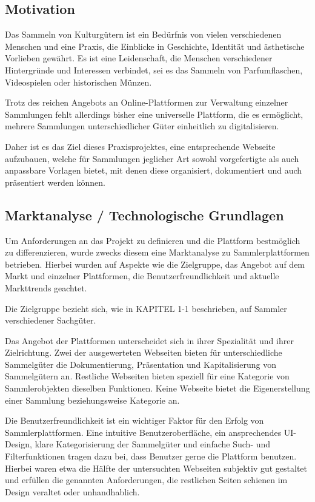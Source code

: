\subsection{Motivation}\label{subsec:Motivation}


Das Sammeln von Kulturgütern ist ein Bedürfnis von vielen verschiedenen Menschen und eine Praxis, die Einblicke in Geschichte, Identität und ästhetische Vorlieben gewährt.
Es ist eine Leidenschaft, die Menschen verschiedener Hintergründe und Interessen verbindet, sei es das Sammeln von Parfumflaschen, Videospielen oder historischen Münzen.

Trotz des reichen Angebots an Online-Plattformen zur Verwaltung einzelner Sammlungen fehlt allerdings bisher eine universelle Plattform, die es ermöglicht, mehrere Sammlungen unterschiedlicher Güter einheitlich zu digitalisieren. \par
Daher ist es das Ziel dieses Praxisprojektes, eine entsprechende Webseite aufzubauen, welche für Sammlungen jeglicher Art sowohl vorgefertigte als auch anpassbare Vorlagen bietet, mit denen diese organisiert, dokumentiert und auch präsentiert werden können.


\subsection{Marktanalyse / Technologische Grundlagen}\label{subsec:Marktanalyse-TechnologischeGrundlagen}

Um Anforderungen an das Projekt zu definieren und die Plattform bestmöglich zu differenzieren, wurde zwecks diesem eine Marktanalyse zu Sammlerplattformen betrieben.
Hierbei wurden auf Aspekte wie die Zielgruppe, das Angebot auf dem Markt und einzelner Plattformen, die Benutzerfreundlichkeit und aktuelle Markttrends geachtet. \par
Die Zielgruppe bezieht sich, wie in KAPITEL 1-1 beschrieben, auf Sammler verschiedener Sachgüter. \linebreak


Das Angebot der Plattformen unterscheidet sich in ihrer Spezialität und ihrer Zielrichtung. Zwei der ausgewerteten Webseiten bieten für unterschiedliche Sammelgüter die Dokumentierung, Präsentation und Kapitalisierung von Sammelgütern an.
Restliche Webseiten bieten speziell für eine Kategorie von Sammlerobjekten dieselben Funktionen.
Keine Webseite bietet die Eigenerstellung einer Sammlung beziehungsweise Kategorie an. \par

Die Benutzerfreundlichkeit ist ein wichtiger Faktor für den Erfolg von Sammlerplattformen.
Eine intuitive Benutzeroberfläche, ein ansprechendes UI-Design, klare Kategorisierung der Sammelgüter und einfache Such- und Filterfunktionen tragen dazu bei, dass Benutzer gerne die Plattform benutzen.
Hierbei waren etwa die Hälfte der untersuchten Webseiten subjektiv gut gestaltet und erfüllen die genannten Anforderungen, die restlichen Seiten schienen im Design veraltet oder unhandhablich. \par

